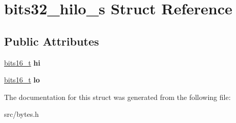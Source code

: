 \hypertarget{structbits32__hilo__s}{}\section{bits32\+\_\+hilo\+\_\+s Struct Reference}
\label{structbits32__hilo__s}
\subsection*{Public Attributes}
\begin{DoxyCompactItemize}
\item 
\hypertarget{structbits32__hilo__s_ada3e7b434275497de479184a4daf010b}{}\label{structbits32__hilo__s_ada3e7b434275497de479184a4daf010b} 
\hyperlink{unionbits16__s}{bits16\+\_\+t} {\bfseries hi}
\item 
\hypertarget{structbits32__hilo__s_a2aa55ad6da1c8e3692bfd378d0db89e8}{}\label{structbits32__hilo__s_a2aa55ad6da1c8e3692bfd378d0db89e8} 
\hyperlink{unionbits16__s}{bits16\+\_\+t} {\bfseries lo}
\end{DoxyCompactItemize}


The documentation for this struct was generated from the following file\+:\begin{DoxyCompactItemize}
\item 
src/bytes.\+h\end{DoxyCompactItemize}
